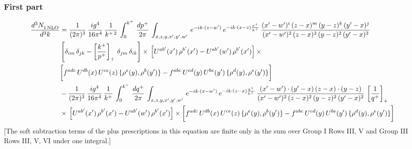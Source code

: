 \documentclass[9pt]{article}
\numberwithin{equation}{section}
\begin{document}
\subsubsection*{First part}
\begin{align}
     \frac{d^{3}N_{1\,\rm NLO}^{\rm}}{d^{3}k}  & =  \frac{1}{(2\pi)^{3}}\, \frac{ig^{4}}{16\pi^{4}}\, \frac{1}{k^{+\,2}}\,\int_{0}^{k^{+}}\, \frac{dp^{+}}{2\pi}\,\int_{x,z,y,x',y'{\color{red},}w'}\,e^{-ik\cdot (z-w^\prime)}\,e^{-ik\cdot (x-z)\frac{p^{+}}{k^{+}}}\,\frac{(x'-w')^{i}\,(z-x)^{m}\,(y-z)^{k}\,(y'-x)^{j}}{(x'-w')^{2}\,(z-x)^{2}\,(y-z)^{2}\,(y'-x)^{2}}\,\notag \\ & \left[\delta_{im}\,\delta_{jk}-\left[\frac{k^{+}}{p^{+}}\right]_{+}\, \delta_{jm}\,\delta_{ik}\right]\times\, \left[U^{ab'}(x')\,\rho^{b'}(x')-U^{ab'}(w')\,\rho^{b'}(x')\right]\times\notag \\ & \bigg[f^{adc}\,U^{db}(x)\,U^{ce}(z)\, \{\rho^{e}(y),\rho^{b}(y')\}-f^{abc}\,U^{cd}(y)\,U^{be}(y')\, \{\rho^{d}(y),\rho^{e}(y')\}\bigg] \notag \\ & -\frac{1}{(2\pi)^{3}}\, \frac{ig^{4}}{16\pi^{4}}\, \frac{1}{k^{+}}\,\int_{0}^{k^{+}}\, \frac{dq^{+}}{2\pi}\,\int_{x,z,y,x',y'{\color{red},}w'}\,e^{-ik\cdot (x-w^\prime)}\,e^{-ik\cdot (z-x)\frac{q^{+}}{k^{+}}}\,\frac{(x'-w')\cdot (y'-x)\,(z-x)\cdot (y-z)}{(x'-w')^{2}\,(z-x)^{2}\,(y-z)^{2}\,(y'-x)^{2}}\,\left[\frac{1}{q^{+}}\right]_{+}\notag \\ & \times\, \left[U^{ab'}(x')\,\rho^{b'}(x')-U^{ab'}(w')\,\rho^{b'}(x')\right]\times \bigg[f^{adc}\,U^{db}(x)\,U^{ce}(z)\, \{\rho^{e}(y),\rho^{b}(y')\}-f^{abc}\,U^{cd}(y)\,U^{be}(y')\, \{\rho^{d}(y),\rho^{e}(y')\}\bigg]
\end{align} {\color{red}[The soft subtraction terms of the plus prescriptions in this equation are finite only in the sum over Group I Rows III, V and Group III Rows III, V, VI under one integral.]}\par\noindent
\end{document}
